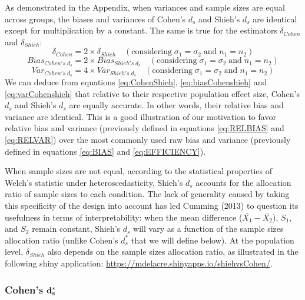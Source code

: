\documentclass[
  english,
  man,floatsintext]{apa6}
\begin{document}
As demonstrated in the Appendix, when variances and sample sizes are equal across groups, the biases and variances of Cohen's \(d_s\) and Shieh's \(d_s\) are identical except for multiplication by a constant. The same is true for the estimators \(\delta_{Cohen}\) and \(\delta_{Shieh}\):\\
\begin{equation} 
\delta_{Cohen} = 2 \times \delta_{Shieh} \quad (\mbox{considering} \; \sigma_1 = \sigma_2 \; \mbox{and} \; n_1 = n_2)
\label{eq:CohenShieh}
\end{equation}
\begin{equation} 
Bias_{Cohen's \; d{_s}} = 2 \times Bias_{Shieh's \; d{_s}} \quad (\mbox{considering} \; \sigma_1 = \sigma_2 \; \mbox{and} \; n_1 = n_2)
\label{eq:biasCohenshieh}
\end{equation}
\begin{equation} 
Var_{Cohen's \; d{_s}} = 4 \times Var_{Shieh's \; d{_s}} \quad (\mbox{considering}\; \sigma_1 = \sigma_2 \; \mbox{and} \; n_1 = n_2)
\label{eq:varCohenshieh}
\end{equation}
We can deduce from equations \ref{eq:CohenShieh}, \ref{eq:biasCohenshieh} and \ref{eq:varCohenshieh} that relative to their respective population effect size, Cohen's \(d_s\) and Shieh's \(d_s\) are equally accurate. In other words, their relative bias and variance are identical. This is a good illustration of our motivation to favor relative bias and variance (previously defined in equations \ref{eq:RELBIAS} and \ref{eq:RELVAR}) over the most commonly used raw bias and variance (previously defined in equations \ref{eq:BIAS} and \ref{eq:EFFICIENCY}).

When sample sizes are not equal, according to the statistical properties of Welch's statistic under heteroscedasticity, Shieh's \(d_s\) accounts for the allocation ratio of sample sizes to each condition. The lack of generality caused by taking this specificity of the design into account has led Cumming (2013) to question its usefulness in terms of interpretability: when the mean difference (\(\bar{X_1}-\bar{X_2}\)), \(S_1\), and \(S_2\) remain constant, Shieh's \(d_s\) will vary as a function of the sample sizes allocation ratio (unlike Cohen's \(d^*_s\) that we will define below). At the population level, \(\delta_{Shieh}\) also depends on the sample sizes allocation ratio, as illustrated in the following shiny application: \url{https://mdelacre.shinyapps.io/shiehvsCohen/}.

\hypertarget{cohens-bf-d_s}{%
\subsubsection{\texorpdfstring{Cohen's \(\bf d^*_s\)}{Cohen's \textbackslash bf d\^{}*\_s}}\label{cohens-bf-d_s}}
\end{document}
